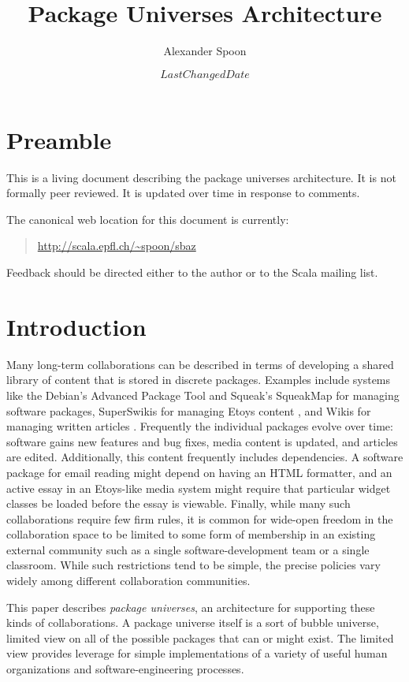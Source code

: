 \documentclass{article}
\begin{document}

\title{Package Universes Architecture}
\author{Alexander Spoon}
\date{$LastChangedDate$}
\maketitle

\section{Preamble}
This is a living document describing the package universes
architecture.  It is not formally peer reviewed.  It is updated over
time in response to comments.

The canonical web location for this document is currently:
\begin{quote}
  \url{http://scala.epfl.ch/~spoon/sbaz}
\end{quote}
Feedback should be directed either to the author or to the Scala
mailing list.


\section{Introduction}
Many long-term collaborations can be described in terms of developing
a shared library of content that is stored in discrete packages.  
Examples include systems like the Debian's Advanced Package Tool and
Squeak's SqueakMap for managing software packages, SuperSwikis for
managing Etoys content \cite{steinmetz02:learning}, and Wikis for
managing written articles \cite{ward01:wikiway}.  Frequently the
individual packages evolve over time: software gains new
features and bug fixes, media content is updated, and articles are
edited.  Additionally, this content frequently includes dependencies.
A software package for email reading might depend on having an HTML
formatter, and an active essay in an Etoys-like media system might
require that particular widget classes be loaded before the essay is
viewable.  Finally, while many such collaborations require few firm
rules, it is common for wide-open freedom in the collaboration space
to be limited to some form of membership in an existing external
community such as a single software-development team or a single
classroom.  While such restrictions tend to be simple, the precise
policies vary widely among different collaboration communities.


This paper describes \emph{package universes}, an architecture for
supporting these kinds of collaborations.  A package universe itself
is a sort of bubble universe, limited view on all of the possible
packages that can or might exist.  The limited view provides leverage
for simple implementations of a variety of useful human organizations
and software-engineering processes.
\end{document}
